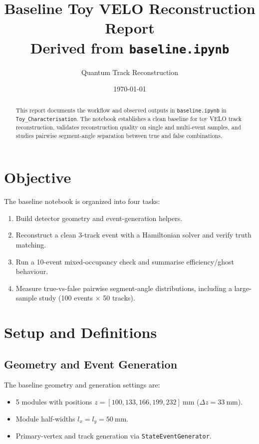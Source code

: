 \documentclass[11pt,a4paper]{article}
\title{Baseline Toy VELO Reconstruction Report\\\large Derived from \texttt{baseline.ipynb}}
\author{Quantum Track Reconstruction}
\date{\today}
\begin{document}
\maketitle

\begin{abstract}
This report documents the workflow and observed outputs in
\texttt{baseline.ipynb} in \texttt{Toy\_Characterisation}. The notebook establishes a
clean baseline for toy VELO track reconstruction, validates reconstruction
quality on single and multi-event samples, and studies pairwise segment-angle
separation between true and false combinations.
\end{abstract}

\section{Objective}
The baseline notebook is organized into four tasks:
\begin{enumerate}[leftmargin=1.5em]
  \item Build detector geometry and event-generation helpers.
  \item Reconstruct a clean 3-track event with a Hamiltonian solver and verify
  truth matching.
  \item Run a 10-event mixed-occupancy check and summarise efficiency/ghost
  behaviour.
  \item Measure true-vs-false pairwise segment-angle distributions, including
  a large-sample study (100 events \(\times\) 50 tracks).
\end{enumerate}

\section{Setup and Definitions}
\subsection{Geometry and Event Generation}
The baseline geometry and generation settings are:
\begin{itemize}[leftmargin=1.5em]
  \item 5 modules with positions
  \(z = [100,133,166,199,232]~\mathrm{mm}\) (\(\Delta z=33~\mathrm{mm}\)).
  \item Module half-widths \(l_x=l_y=50~\mathrm{mm}\).
  \item Primary-vertex and track generation via
  \texttt{StateEventGenerator}.
\end{itemize}
\end{document}
